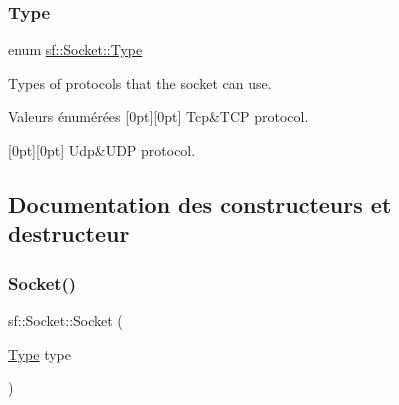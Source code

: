 \subsubsection{\texorpdfstring{Type}{Type}}
{\footnotesize\ttfamily enum \hyperlink{classsf_1_1Socket_a5d3ff44e56e68f02816bb0fabc34adf8}{sf\+::\+Socket\+::\+Type}\hspace{0.3cm}{\ttfamily [protected]}}



Types of protocols that the socket can use. 

\begin{DoxyEnumFields}{Valeurs énumérées}
[0pt][0pt]{}\mbox{\label{classsf_1_1Socket_a5d3ff44e56e68f02816bb0fabc34adf8acc02e97e90234b957eaad4dff7f22214}} 
Tcp&T\+CP protocol. \\
\hline

[0pt][0pt]{}\mbox{\label{classsf_1_1Socket_a5d3ff44e56e68f02816bb0fabc34adf8a6ebf3094830db4820191a327f3cc6ce2}} 
Udp&U\+DP protocol. \\
\hline

\end{DoxyEnumFields}


\subsection{Documentation des constructeurs et destructeur}
\mbox{\label{classsf_1_1Socket_a80ffb47ec0bafc83af019055d3e6a303}} 
\subsubsection{\texorpdfstring{Socket()}{Socket()}}
{\footnotesize\ttfamily sf\+::\+Socket\+::\+Socket (\begin{DoxyParamCaption}\item[{\hyperlink{classsf_1_1Socket_a5d3ff44e56e68f02816bb0fabc34adf8}{Type}}]{type }\end{DoxyParamCaption})\hspace{0.3cm}{\ttfamily [protected]}}



